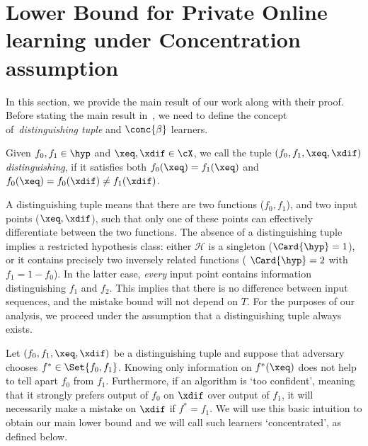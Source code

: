 \section[Lower bound under concentration assumption]{Lower Bound for Private Online learning under Concentration assumption}
\label{sec:main}

In this section, we provide the main result of our work along with their proof. Before stating the main result in~, we need to define the concept of~\emph{distinguishing tuple} and \(\conc{\beta}\) learners.



\begin{definition}\label{defn:dist-tuple}
    Given \(f_0, f_1 \in \hyp\) and \(\xeq, \xdif \in \cX\), we call the tuple \((f_0, f_1, \xeq, \xdif)\) \emph{distinguishing},
    if  it satisfies both \(f_0(\xeq) = f_1(\xeq)\) and \(f_0(\xeq) = f_0(\xdif) \neq f_1(\xdif)\).
\end{definition}
A distinguishing tuple means that there are two functions (\(f_0, f_1\)), and two input points (\(\xeq, \xdif\)), such that only one of these points can effectively differentiate between the two functions. The absence of a distinguishing tuple implies a restricted hypothesis class: either \(\mathcal{H}\) is a singleton (\(\Card{\hyp} = 1\)), or it contains precisely two inversely related functions ( \(\Card{\hyp} = 2\) with \(f_1 = 1 - f_0\)). In the latter case, \emph{every} input point contains information distinguishing \(f_1\) and \(f_2\).
This implies that there is no difference between input sequences, and the mistake bound will not depend on \(T\). For the purposes of our analysis, we proceed under the assumption that a distinguishing tuple always exists.


Let \((f_0, f_1, \xeq, \xdif)\) be a distinguishing tuple and suppose that adversary chooses \(f^{\ast} \in \Set{f_0, f_1}\).
Knowing only information on \(f^{\ast}(\xeq)\) does not help to tell apart \(f_0\) from \(f_1\).
Furthermore, if an algorithm is `too confident', meaning that it strongly prefers output of \(f_0\) on \(\xdif\) over output of \(f_1\), 
it will necessarily make a mistake on \(\xdif\) if \(f^{\ast} = f_1\). We will use this basic intuition to obtain our main lower bound and we will call such learners `concentrated', as defined below.

